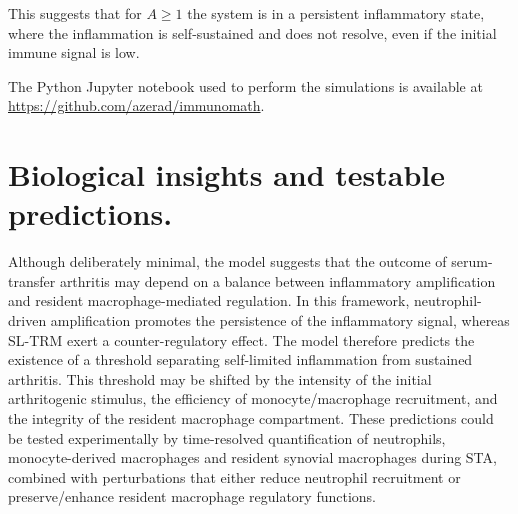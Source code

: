 \documentclass[a4paper, 12pt]{article}
\begin{document}
  This suggests that for $A\geq 1$ the system is in a persistent inflammatory state, where the  inflammation is self-sustained and does not resolve, even if the initial immune signal is low.


The Python Jupyter notebook used to perform the simulations is available at \url{https://github.com/azerad/immunomath}.

\section{Biological insights and testable predictions.}\label{sec:insights_predictions}
Although deliberately minimal, 
the model suggests that the outcome of serum-transfer arthritis may depend on a balance between inflammatory amplification and resident macrophage-mediated regulation. 
In this framework, neutrophil-driven amplification promotes the persistence of the inflammatory signal, whereas SL-TRM exert a counter-regulatory effect. 
The model therefore predicts the existence of a threshold separating self-limited inflammation from sustained arthritis. 
This threshold may be shifted by the intensity of the initial arthritogenic stimulus, the efficiency of monocyte/macrophage recruitment, and the integrity of the resident macrophage compartment. 
These predictions could be tested experimentally by time-resolved quantification of neutrophils, monocyte-derived macrophages and resident synovial macrophages during STA, 
combined with perturbations that either reduce neutrophil recruitment or preserve/enhance resident macrophage regulatory functions.
\end{document}

